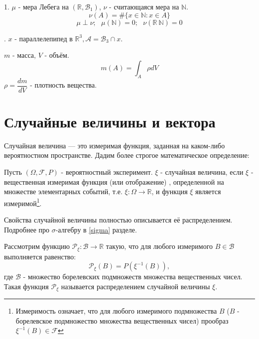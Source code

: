 \begin{exmp}
	1. $\mu$ - мера Лебега на $(\mathbb{R}, \mathcal{B}_1)$, $\nu$ - считающаяся мера на $\mathbb{N}$.
	\[ \nu (A) = \# \{ x \in \mathbb{N} : x \in A \} \]
	\[ \mu \perp \nu; ~~~ \mu (\mathbb{N}) = 0; ~~~ \nu (\mathbb{R} \ \mathbb{N}) = 0 \]
	
	. $x$ - параллелепипед в $\mathbb{R}^3, \mathcal{A} = \mathcal{B}_3 \cap x$.
	
	\noindent $m$ - масса, $V$ - объём.
	\[ m(A) = \int_A \rho dV \]
	\noindent $\rho = \dfrac{dm}{dV}$ - плотность вещества. 
\end{exmp}

\section{Случайные величины и вектора}

\begin{definition}
	Случайная величина — это измеримая функция, заданная на каком-либо вероятностном пространстве. Дадим более строгое математическое определение:
	
	Пусть $(\Omega, \mathcal{F}, P)$ - вероятностный эксперимент. $\xi$ - случайная величина, если $\xi$ - вещественная измеримая функция (или отображение) , определенной на множестве элементарных событий, т.е. $\xi: \Omega \to \mathbb{R}$, и функция $\xi$ является измеримой\footnote{Измеримость означает, что для любого измеримого подмножества $B$ ($B$ - борелевское подмножество множества вещественных чисел) прообраз $\xi^{-1} (B) \in \mathcal{F}$}.
\end{definition}
\begin{remark}
	Свойства случайной величины полностью описывается её распределением. Подробнее про $\sigma$-алгебру в \ref{sigma} разделе.
\end{remark}

\begin{definition}
	Рассмотрим функцию $\mathcal{P}_{\xi}: \mathcal{B} \to \mathbb{R}$ такую, что для любого измеримого $B \in \mathcal{B}$ выполняется равенство:
	\[ \mathcal{P}_{\xi} (B) = P (\xi^{-1} (B)), \]
	где $\mathcal{B}$ - множество борелевских подмножеств множества вещественных чисел. Такая функция $\mathcal{P}_{\xi}$ называется распределением случайной величины $\xi$.
\end{definition}

